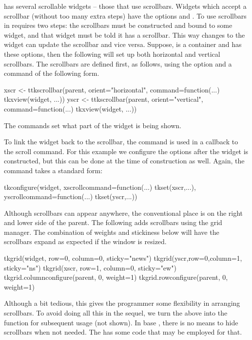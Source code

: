 \TK\/ has several scrollable widgets -- those that use scrollbars.
Widgets which accept a scrollbar (without too many extra steps) have
the options  and .  To use
scrollbars in  requires two steps: the scrollbars must be
constructed and bound to some widget, and that widget must be told it
has a scrollbar. This way changes to the widget can update the
scrollbar and vice versa. Suppose,  is a container and
 has these options, then the following will set up both
horizontal and vertical scrollbars. The scrollbars are defined first, as follows, using the
 option and a command of the following
form.
%
\begin{Schunk}
\begin{Sinput}
 xscr <- ttkscrollbar(parent, orient="horizontal",
                  command=function(...) tkxview(widget, ...))
 yscr <- ttkscrollbar(parent, orient="vertical",
                  command=function(...) tkxview(widget, ...))
\end{Sinput}
\end{Schunk}
%
The  commands set what part of the widget is being shown.

To link the widget back to the scrollbar, the  command is
used in a callback to the scroll command.  For this example we
configure the options after the widget is constructed, but this can be
done at the time of construction as well. Again, the command takes a
standard form:
\begin{Schunk}
\begin{Sinput}
 tkconfigure(widget,
             xscrollcommand=function(...) tkset(xscr,...),
             yscrollcommand=function(...) tkset(yscr,...))
\end{Sinput}
\end{Schunk}

Although scrollbars can appear anywhere, the conventional place is on
the right and lower side of the parent. The following adds scrollbars
using the grid manager. The combination of weights and stickiness
below will have the scrollbars expand as expected if the window is
resized.
\begin{Schunk}
\begin{Sinput}
 tkgrid(widget, row=0, column=0, sticky="news")
 tkgrid(yscr,row=0,column=1, sticky="ns")
 tkgrid(xscr, row=1, column=0, sticky="ew")
 tkgrid.columnconfigure(parent, 0, weight=1)
 tkgrid.rowconfigure(parent, 0, weight=1)
\end{Sinput}
\end{Schunk}
%
Although a bit tedious, this gives the programmer some flexibility in
arranging scrollbars. To avoid doing all this in the sequel, we turn
the above into the function  for subsequent
usage (not shown). In base \Tk, there is no means to hide scrollbars
when not needed. The  has some code that may be employed
for that.


